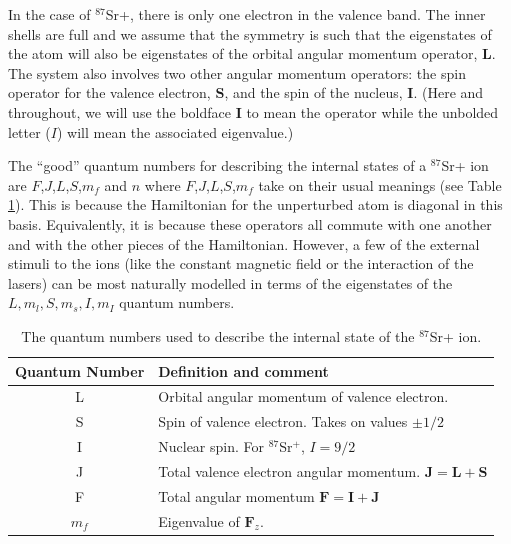 In the case of $^{87}$Sr+, there is only one electron in the valence band. The inner shells are full and we assume that the symmetry is such that the eigenstates of the atom will also be eigenstates of the orbital angular momentum operator, $\mathbf{L}$.
 The system also involves two other angular momentum operators: the spin operator for the valence electron, $\mathbf{S}$, %
 and the spin of the nucleus, $\mathbf{I}$. 
(Here and throughout, we will use the boldface $\mathbf{I}$ to mean the operator while the unbolded letter ($I$) will mean the associated eigenvalue.)

The ``good'' quantum numbers for describing the internal states of a $^{87}$Sr+ ion are $F$,$J$,$L$,$S$,$m_f$ and $n$\cite{experimental_hyperfine_alkali_arimondo}\cite{cuaMITnotes} where $F$,$J$,$L$,$S$,$m_f$ take on their usual meanings (see Table\,\ref{quantumNumberQuickref}). This is because the Hamiltonian for the unperturbed atom is diagonal in this basis. Equivalently, it is because these operators all commute with one another and with the other pieces of the Hamiltonian. However, a few of the external stimuli to the ions (like the constant magnetic field or the interaction of the lasers) can be most naturally modelled in terms of the eigenstates of the $L,m_l,S,m_s,I,m_I$ quantum numbers.   

\begin{table}[h!]
\centering
\begin{tabular}{|c|l|}
\hline
Quantum Number & Definition and comment \\ \hline \hline
L & Orbital angular momentum of valence electron. \\ \hline
S & Spin of valence electron. Takes on values $\pm 1/2$ \\ \hline
I & Nuclear spin. For $^{87}$Sr$^+$, $I=9/2$ \\ \hline
J & Total valence electron angular momentum. $\mathbf{J}=\mathbf{L}+\mathbf{S}$ \\ \hline
F & Total angular momentum $\mathbf{F}=\mathbf{I}+\mathbf{J}$ \\ \hline
$m_f$ & Eigenvalue of $\mathbf{F}_z$.\\ \hline
\end{tabular}
\caption{The quantum numbers used to describe the internal state of the $^{87}$Sr+ ion.}
\label{quantumNumberQuickref}
\end{table}

